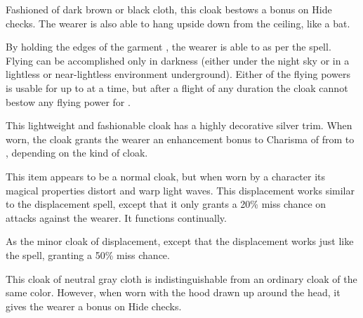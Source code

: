  Fashioned of dark brown or black cloth, this cloak bestows a   bonus on Hide checks. The wearer is also able to hang upside down from the ceiling, like a bat.

By holding the edges of the garment , the wearer is able to  as per the spell. Flying can be accomplished only in darkness (either under the night sky or in a lightless or near-lightless environment underground). Either of the flying powers is usable for up to  at a time, but after a flight of any duration the cloak cannot bestow any flying power for .

 This lightweight and fashionable cloak has a highly decorative silver trim. When worn, the cloak grants the wearer an enhancement bonus to Charisma of from  to , depending on the kind of cloak.

 This item appears to be a normal cloak, but when worn by a character its magical properties distort and warp light waves. This displacement works similar to the displacement spell, except that it only grants a 20\% miss chance on attacks against the wearer. It functions continually.

 As the minor cloak of displacement, except that the displacement works just like the  spell, granting a 50\% miss chance.

 This cloak of neutral gray cloth is indistinguishable from an ordinary cloak of the same color. However, when worn with the hood drawn up around the head, it gives the wearer a   bonus on Hide checks.

